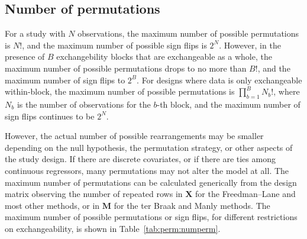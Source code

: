 \subsection{Number of permutations} 

For a study with $N$ observations, the maximum number of possible permutations is $N!$, and the maximum number of possible sign flips is $2^N$. However, in the presence of $B$ exchangebility blocks that are exchangeable as a whole, the maximum number of possible permutations drops to no more than $B!$, and the maximum number of sign flips to $2^B$. For designs where data is only exchangeable within-block, the maximum number of possible permutations is $\prod_{b=1}^{B} N_{b}!$, where $N_{b}$ is the number of observations for the $b$-th block, and the maximum number of sign flips continues to be $2^N$.

However, the actual number of possible rearrangements may be smaller depending on the null hypothesis, the permutation strategy, or other aspects of the study design. If there are discrete covariates, or if there are ties among continuous regressors, many permutations may not alter the model at all. The maximum number of permutations can be calculated generically from the design matrix observing the number of repeated rows in $\mathbf{X}$ for the Freedman--Lane and most other methods, or in $\mathbf{M}$ for the ter Braak and Manly methods. The maximum number of possible permutations or sign flips, for different restrictions on exchangeability, is shown in Table~\ref{tab:perm:numperm}.

